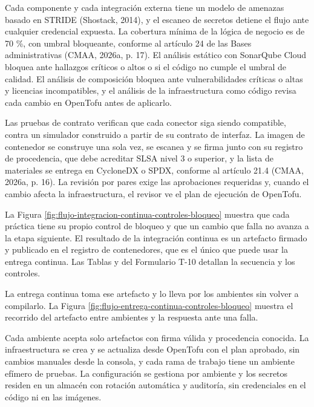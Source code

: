 \documentclass[subdoc]{../../comun/overfore}
\begin{document}
Cada componente y cada integración externa tiene un modelo de amenazas basado en STRIDE (Shostack, 2014), y el escaneo de secretos detiene el flujo ante cualquier credencial expuesta. La cobertura mínima de la lógica de negocio es de 70 \%, con umbral bloqueante, conforme al artículo 24 de las Bases administrativas (CMAA, 2026a, p. 17). El análisis estático con SonarQube Cloud bloquea ante hallazgos críticos o altos o si el código no cumple el umbral de calidad. El análisis de composición bloquea ante vulnerabilidades críticas o altas y licencias incompatibles, y el análisis de la infraestructura como código revisa cada cambio en OpenTofu antes de aplicarlo.

Las pruebas de contrato verifican que cada conector siga siendo compatible, contra un simulador construido a partir de su contrato de interfaz. La imagen de contenedor se construye una sola vez, se escanea y se firma junto con su registro de procedencia, que debe acreditar SLSA nivel 3 o superior, y la lista de materiales se entrega en CycloneDX o SPDX, conforme al artículo 21.4 (CMAA, 2026a, p. 16). La revisión por pares exige las aprobaciones requeridas y, cuando el cambio afecta la infraestructura, el revisor ve el plan de ejecución de OpenTofu.

La Figura \ref{fig:flujo-integracion-continua-controles-bloqueo} muestra que cada práctica tiene su propio control de bloqueo y que un cambio que falla no avanza a la etapa siguiente. El resultado de la integración continua es un artefacto firmado y publicado en el registro de contenedores, que es el único que puede usar la entrega continua. Las Tablas  y  del Formulario T-10 detallan la secuencia y los controles.

La entrega continua toma ese artefacto y lo lleva por los ambientes sin volver a compilarlo. La Figura \ref{fig:flujo-entrega-continua-controles-bloqueo} muestra el recorrido del artefacto entre ambientes y la respuesta ante una falla.

Cada ambiente acepta solo artefactos con firma válida y procedencia conocida. La infraestructura se crea y se actualiza desde OpenTofu con el plan aprobado, sin cambios manuales desde la consola, y cada rama de trabajo tiene un ambiente efímero de pruebas. La configuración se gestiona por ambiente y los secretos residen en un almacén con rotación automática y auditoría, sin credenciales en el código ni en las imágenes.
\end{document}
